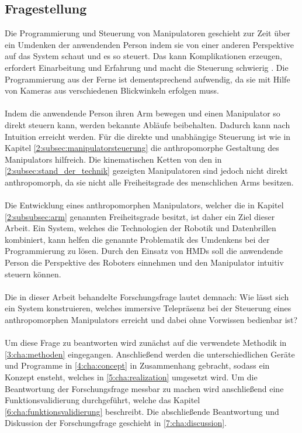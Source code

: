 \subsection{Fragestellung}
Die Programmierung und Steuerung von Manipulatoren geschieht zur Zeit über ein Umdenken der anwendenden Person indem sie von einer anderen Perspektive auf das System schaut und es so steuert. Das kann Komplikationen erzeugen, erfordert Einarbeitung und Erfahrung und macht die Steuerung schwierig \cite[S.190]{ehlers_echtzeitfahige_2019}. Die Programmierung aus der Ferne ist dementsprechend aufwendig, da sie mit Hilfe von Kameras aus verschiedenen Blickwinkeln erfolgen muss.\\\\
Indem die anwendende Person ihren Arm bewegen und einen Manipulator so direkt steuern kann, werden bekannte Abläufe beibehalten. Dadurch kann nach \cite{blackler_towards_2007} Intuition erreicht werden. Für die direkte und unabhängige Steuerung ist wie in Kapitel \ref{2:subsec:manipulatorsteuerung} die anthropomorphe Gestaltung des Manipulators hilfreich. Die kinematischen Ketten von den in \ref{2:subsec:stand_der_technik} gezeigten Manipulatoren sind jedoch nicht direkt anthropomorph, da sie nicht alle Freiheitsgrade des menschlichen Arms besitzen.\\\\
Die Entwicklung eines anthropomorphen Manipulators, welcher die in Kapitel \ref{2:subsubsec:arm} genannten Freiheitsgrade besitzt, ist daher ein Ziel dieser Arbeit. Ein System, welches die Technologien der Robotik und Datenbrillen kombiniert, kann helfen die genannte Problematik des Umdenkens bei der Programmierung zu lösen. Durch den Einsatz von HMDs soll die anwendende Person die Perspektive des Roboters einnehmen und den Manipulator intuitiv steuern können.\\\\
Die in dieser Arbeit behandelte Forschungsfrage lautet demnach: Wie lässt sich ein System konstruieren, welches immersive Telepräsenz bei der Steuerung eines anthropomorphen Manipulators erreicht und dabei ohne Vorwissen bedienbar ist?\\\\
Um diese Frage zu beantworten wird zunächst auf die verwendete Methodik in \ref{3:cha:methoden} eingegangen. Anschließend werden die unterschiedlichen Geräte und Programme in \ref{4:cha:concept} in Zusammenhang gebracht, sodass ein Konzept ensteht, welches in \ref{5:cha:realization} umgesetzt wird. Um die Beantwortung der Forschungsfrage messbar zu machen wird anschließend eine Funktionsvalidierung durchgeführt, welche das Kapitel \ref{6:cha:funktionsvalidierung} beschreibt. Die abschließende Beantwortung und Diskussion der Forschungsfrage geschieht in \ref{7:cha:discussion}.
